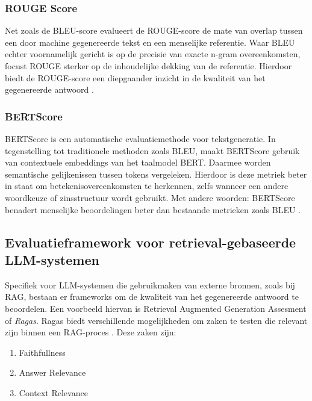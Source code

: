 \subsubsection{ROUGE Score}

Net zoals de BLEU-score evalueert de ROUGE-score de mate van overlap tussen een door machine gegenereerde tekst en een menselijke referentie. Waar BLEU echter voornamelijk gericht is op de precisie van exacte n-gram overeenkomsten, focust ROUGE sterker op de inhoudelijke dekking van de referentie. Hierdoor biedt de ROUGE-score een diepgaander inzicht in de kwaliteit van het gegenereerde antwoord \autocite{ganesan2018rouge20updatedimproved}.

\subsubsection{BERTScore}

BERTScore is een automatische evaluatiemethode voor tekstgeneratie. In tegenstelling tot traditionele methoden zoals BLEU, maakt BERTScore gebruik van contextuele embeddings van het taalmodel BERT. Daarmee worden semantische gelijkenissen tussen tokens vergeleken. Hierdoor is deze metriek beter in staat om betekenisovereenkomsten te herkennen, zelfs wanneer een andere woordkeuze of zinsstructuur wordt gebruikt. Met andere woorden: BERTScore benadert menselijke beoordelingen beter dan bestaande metrieken zoals BLEU \autocite{Zhang2019}.

\subsection{Evaluatieframework voor retrieval-gebaseerde LLM-systemen}

Specifiek voor LLM-systemen die gebruikmaken van externe bronnen, zoals bij RAG, bestaan er frameworks om de kwaliteit van het gegenereerde antwoord te beoordelen. Een voorbeeld hiervan is Retrieval Augmented Generation Assesment of \textit{Ragas}. Ragas biedt verschillende mogelijkheden om zaken te testen die relevant zijn binnen een RAG-proces \autocite{Es2023}. Deze zaken zijn:
\begin{enumerate}
    \item Faithfullness
    \item Answer Relevance
    \item Context Relevance
\end{enumerate}

